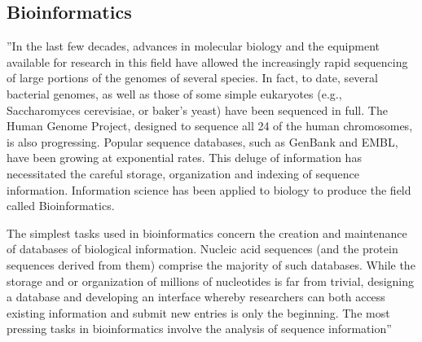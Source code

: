 \subsection{Bioinformatics}
\label{sec:bioinformatics}

''In the last few decades, advances in molecular biology and the equipment available for research in this field have allowed the increasingly rapid sequencing of large portions of the genomes of several species. In fact, to date, several bacterial genomes, as well as those of some simple eukaryotes (e.g., Saccharomyces cerevisiae, or baker's yeast) have been sequenced in full. The Human Genome Project, designed to sequence all 24 of the human chromosomes, is also progressing. Popular sequence databases, such as GenBank and EMBL, have been growing at exponential rates. This deluge of information has necessitated the careful storage, organization and indexing of sequence information. Information science has been applied to biology to produce the field called Bioinformatics.


The simplest tasks used in bioinformatics concern the creation and maintenance of databases of biological information. Nucleic acid sequences (and the protein sequences derived from them) comprise the majority of such databases. While the storage and or organization of millions of nucleotides is far from trivial, designing a database and developing an interface whereby researchers can both access existing information and submit new entries is only the beginning. The most pressing tasks in bioinformatics involve the analysis of sequence information''~\cite{Biology}


